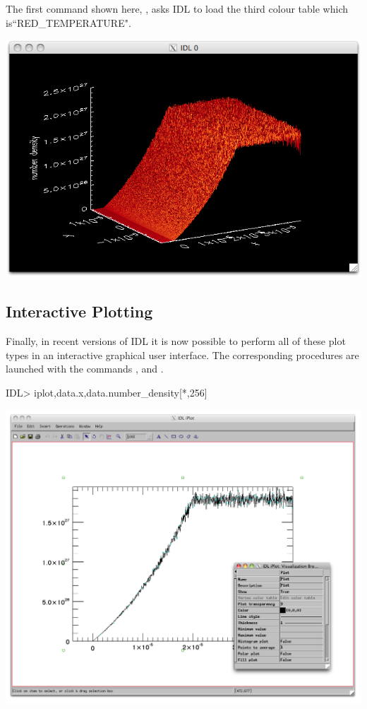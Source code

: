   The first command shown here, , asks IDL to load the third
  colour table which is\linebreak ``RED\_TEMPERATURE".

  \begin{center}
    \includegraphics[width=0.8\linewidth]{images/idl_shade_surf}
  \end{center}

\subsection{Interactive Plotting}
  Finally, in recent versions of IDL it is now possible to perform all of
  these plot types in an interactive graphical user interface. The corresponding
  procedures are launched with the commands , 
  and .

\begin{boxverbatim}
IDL> iplot,data.x,data.number_density[*,256]
\end{boxverbatim}
  \begin{center}
    \includegraphics[width=0.8\linewidth]{images/idl_iplot}
  \end{center}

